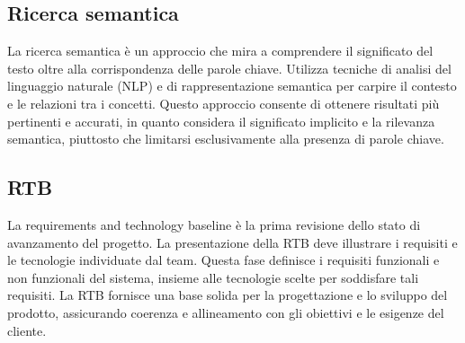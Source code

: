 \vspace{2em}
\subsection*{Ricerca semantica}
\par La ricerca semantica è un approccio che mira a comprendere il significato del testo oltre alla corrispondenza delle parole chiave. Utilizza tecniche di analisi del linguaggio naturale (NLP) e di rappresentazione semantica per carpire il contesto e le relazioni tra i concetti. Questo approccio consente di ottenere risultati più pertinenti e accurati, in quanto considera il significato implicito e la rilevanza semantica, piuttosto che limitarsi esclusivamente alla presenza di parole chiave.

\vspace{2em}
\subsection*{RTB}
\par La requirements and technology baseline è la prima revisione dello stato di avanzamento del progetto. La presentazione della RTB deve illustrare i requisiti e le tecnologie individuate dal team. Questa fase definisce i requisiti funzionali e non funzionali del sistema, insieme alle tecnologie scelte per soddisfare tali requisiti. La RTB fornisce una base solida per la progettazione e lo sviluppo del prodotto, assicurando coerenza e allineamento con gli obiettivi e le esigenze del cliente.
